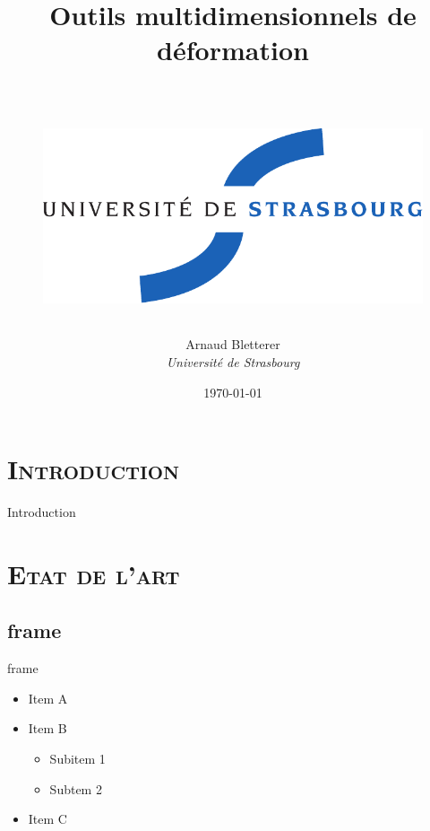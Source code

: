 \documentclass[xcolor=x11names,compress]{beamer}
\renewcommand{\(}{\begin{columns}}
\renewcommand{\)}{\end{columns}}
\newcommand{\<}[1]{\begin{column}{#1}}
\renewcommand{\>}{\end{column}}
\begin{document}
\section{\scshape Introduction}
\begin{frame}
  \title{Outils multidimensionnels de déformation\\~\\

    \begin{figure}[h]
      \includegraphics[scale=0.3]{UDS-logo.pdf}
    \end{figure}
  } \date{\vspace{0.5cm} \today }

  \author{Arnaud Bletterer\\
  \it Université de Strasbourg}

  \titlepage
\end{frame}

\begin{frame}{Introduction}
  \tableofcontents
\end{frame}

\section{\scshape Etat de l'art}
\subsection{frame}
\begin{frame}{frame}
\begin{itemize}
\item Item A
\item Item B
\begin{itemize}
\item Subitem 1
\item Subtem 2
\end{itemize}
\item Item C
\end{itemize}
\end{frame}
\end{document}

